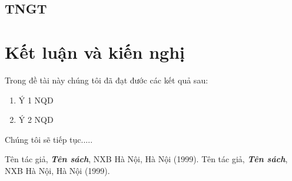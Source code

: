 \documentclass[12pt, a4paper,oneside]{book}
\theoremstyle{definition}
\begin{document}
\section{TNGT}


\chapter*{Kết luận và kiến nghị} 

Trong đề tài này chúng tôi đã đạt đước các kết quả sau:
\begin{enumerate}[(1)]
	\item
	Ý 1 NQD
	\item
     Ý 2 NQD
	
\end{enumerate} 

Chúng tôi sẽ tiếp tục.....
\begin{thebibliography}{99}
	 Tên tác giả, \textbf{\textit{Tên sách}}, NXB Hà Nội, Hà Nội (1999).
	 Tên tác giả, \textbf{\textit{Tên sách}}, NXB Hà Nội, Hà Nội (1999).
	
\end{thebibliography} 
\end{document}
